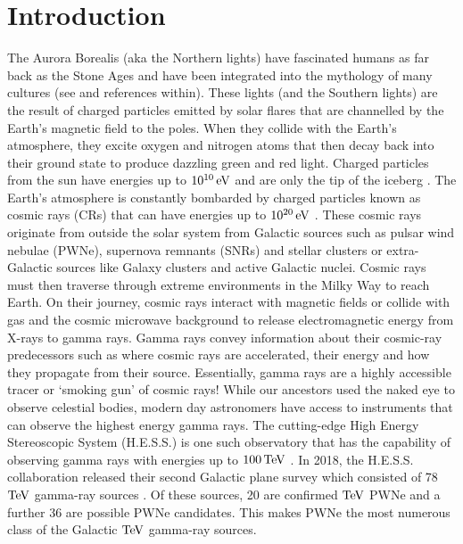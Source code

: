 \chapter{Introduction}

The Aurora Borealis (aka the Northern lights) have fascinated humans as far back as the Stone Ages and have been integrated into the mythology of many cultures (see \cite{1980mlas.book.....E} and references within). These lights (and the Southern lights) are the result of charged particles emitted by solar flares that are channelled by the Earth's magnetic field to the poles. When they collide with the Earth's atmosphere, they excite oxygen and nitrogen atoms that then decay back into their ground state to produce dazzling green and red light. Charged particles from the sun have energies up to $10^{10}\,\si{\electronvolt}$ and are only the tip of the iceberg \citep{2011hea..book.....L}. 
\newpar
The Earth's atmosphere is constantly bombarded by charged particles known as cosmic rays (CRs) that can have energies up to $10^{20}\,\si{\electronvolt}$ \citep{alma9924446790001811}. These cosmic rays originate from outside the solar system from Galactic sources such as pulsar wind nebulae (PWNe), supernova remnants (SNRs) and stellar clusters or extra-Galactic sources like Galaxy clusters and active Galactic nuclei.
\newpar
Cosmic rays must then traverse through extreme environments in the Milky Way to reach Earth. On their journey, cosmic rays interact with magnetic fields or collide with gas and the cosmic microwave background to release electromagnetic energy from X-rays to gamma rays. Gamma rays convey information about their cosmic-ray predecessors such as where cosmic rays are accelerated, their energy and how they propagate from their source. Essentially, gamma rays are a highly accessible tracer or `smoking gun' of cosmic rays! 
\newpar 
While our ancestors used the naked eye to observe celestial bodies, modern day astronomers have access to instruments that can observe the highest energy gamma rays. The cutting-edge High Energy Stereoscopic System (H.E.S.S.) is one such observatory that has the capability of observing gamma rays with energies up to $100\,\TeV$ \citep{HESS}. In 2018, the H.E.S.S. collaboration released their second Galactic plane survey which consisted of 78 $\TeV$ gamma-ray sources \citep{2018A&A...612A...1H}. Of these sources, 20 are confirmed $\TeV$ PWNe and a further 36 are possible PWNe candidates. This makes PWNe the most numerous class of the Galactic $\TeV$ gamma-ray sources.
\newpar 
